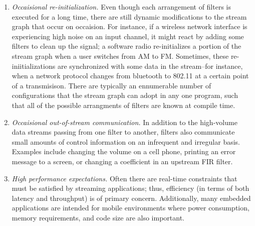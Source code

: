\begin{enumerate}
\item {\it Occaisional re-initialization.}  Even though each
arrangement of filters is executed for a long time, there are still
dynamic modifications to the stream graph that occur on occaision.
For instance, if a wireless network interface is experiencing high
noise on an input channel, it might react by adding some filters to
clean up the signal; a software radio re-initializes a portion of the
stream graph when a user switches from AM to FM.  Sometimes, these
re-iniitializations are synchronized with some data in the stream--for
instance, when a network protocol changes from bluetooth to 802.11 at
a certain point of a transmisison.  There are typically an ennumerable
number of configurations that the stream graph can adopt in any one
program, such that all of the possible arrangments of filters are
known at compile time.

\item {\it Occaisional out-of-stream communication.}  In addition to
the high-volume data streams passing from one filter to another,
filters also communicate small amounts of control information on an
infrequent and irregular basis.  Examples include changing the volume
on a cell phone, printing an error message to a screen, or changing a
coefficient in an upstream FIR filter.

\item {\it High performance expectations.}  Often there are real-time
constraints that must be satisfied by streaming applications; thus,
efficiency (in terms of both latency and throughput) is of primary
concern.  Additionally, many embedded applications are intended for
mobile environments where power consumption, memory requirements, and
code size are also important.

\end{enumerate}

 





